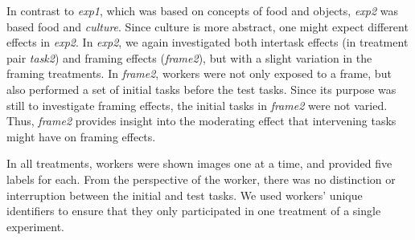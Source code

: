 \documentclass[12pt]{article}
\begin{document}
In contrast to \textit{exp1}, which was based on concepts of food and
objects, \textit{exp2} was based food and \textit{culture}.
Since culture is more abstract, one might expect different effects 
in \textit{exp2}.  In \textit{exp2}, we again investigated both
intertask effects (in treatment pair \textit{task2}) and framing effects 
(\textit{frame2}), but with a slight variation in the framing treatments.
In \textit{frame2}, workers were not only exposed to a frame, but also 
performed a set of initial tasks before the test tasks.  Since its purpose 
was still
to investigate framing effects, the initial tasks in \textit{frame2}
were not varied. Thus, \textit{frame2} provides insight into the moderating 
effect that intervening tasks might have on framing effects.

In all treatments, workers were shown images one at a time, and provided five 
labels for each.  From the perspective of the worker, there was no
distinction or interruption between the initial and test tasks.  We used
workers' unique identifiers to ensure that they only participated in
one treatment of a single experiment.
\end{document}
